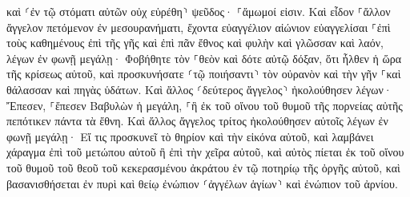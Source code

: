 \documentclass{openreader}
\begin{document}
καὶ ⸂ἐν τῷ στόματι αὐτῶν οὐχ εὑρέθη⸃ ψεῦδος· ⸀ἄμωμοί εἰσιν. 
Καὶ εἶδον ⸀ἄλλον ἄγγελον πετόμενον ἐν μεσουρανήματι, ἔχοντα εὐαγγέλιον αἰώνιον εὐαγγελίσαι ⸀ἐπὶ τοὺς καθημένους ἐπὶ τῆς γῆς καὶ ἐπὶ πᾶν ἔθνος καὶ φυλὴν καὶ γλῶσσαν καὶ λαόν, 
λέγων ἐν φωνῇ μεγάλῃ· Φοβήθητε τὸν ⸀θεὸν καὶ δότε αὐτῷ δόξαν, ὅτι ἦλθεν ἡ ὥρα τῆς κρίσεως αὐτοῦ, καὶ προσκυνήσατε ⸂τῷ ποιήσαντι⸃ τὸν οὐρανὸν καὶ τὴν γῆν ⸀καὶ θάλασσαν καὶ πηγὰς ὑδάτων. 
Καὶ ἄλλος ⸂δεύτερος ἄγγελος⸃ ἠκολούθησεν λέγων· Ἔπεσεν, ⸀ἔπεσεν Βαβυλὼν ἡ μεγάλη, ⸀ἣ ἐκ τοῦ οἴνου τοῦ θυμοῦ τῆς πορνείας αὐτῆς πεπότικεν πάντα τὰ ἔθνη. 
Καὶ ἄλλος ἄγγελος τρίτος ἠκολούθησεν αὐτοῖς λέγων ἐν φωνῇ μεγάλῃ· Εἴ τις προσκυνεῖ τὸ θηρίον καὶ τὴν εἰκόνα αὐτοῦ, καὶ λαμβάνει χάραγμα ἐπὶ τοῦ μετώπου αὐτοῦ ἢ ἐπὶ τὴν χεῖρα αὐτοῦ, 
καὶ αὐτὸς πίεται ἐκ τοῦ οἴνου τοῦ θυμοῦ τοῦ θεοῦ τοῦ κεκερασμένου ἀκράτου ἐν τῷ ποτηρίῳ τῆς ὀργῆς αὐτοῦ, καὶ βασανισθήσεται ἐν πυρὶ καὶ θείῳ ἐνώπιον ⸂ἀγγέλων ἁγίων⸃ καὶ ἐνώπιον τοῦ ἀρνίου. 
\end{document}
